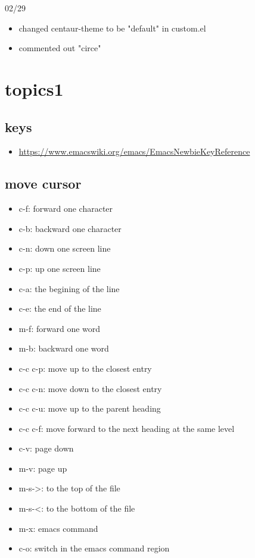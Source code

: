 \documentclass[11pt]{article}
\begin{document}
02/29
\begin{itemize}
\item changed centaur-theme to be "default" in custom.el
\item commented out "circe"
\end{itemize}


\section{topics1}
\label{sec:orga1d6d65}
\subsection{keys}
\label{sec:org7c9b861}
\begin{itemize}
\item \url{https://www.emacswiki.org/emacs/EmacsNewbieKeyReference}
\end{itemize}
\subsection{move cursor}
\label{sec:orgfe28edd}
\begin{itemize}
\item c-f: forward one character
\item c-b: backward one character
\item c-n: down one screen line
\item c-p: up one screen line
\item c-a: the begining of the line
\item c-e: the end of the line

\item m-f: forward one word
\item m-b: backward one word
\item c-c c-p: move up to the closest entry
\item c-c c-n: move down to the closest entry
\item c-c c-u: move up to the parent heading
\item c-c c-f: move forward to the next heading at the same level

\item c-v: page down
\item m-v: page up
\item m-s->: to the top of the file
\item m-s-<: to the bottom of the file

\item m-x: emacs command
\item c-o: switch in the emacs command region
\end{itemize}
\end{document}
